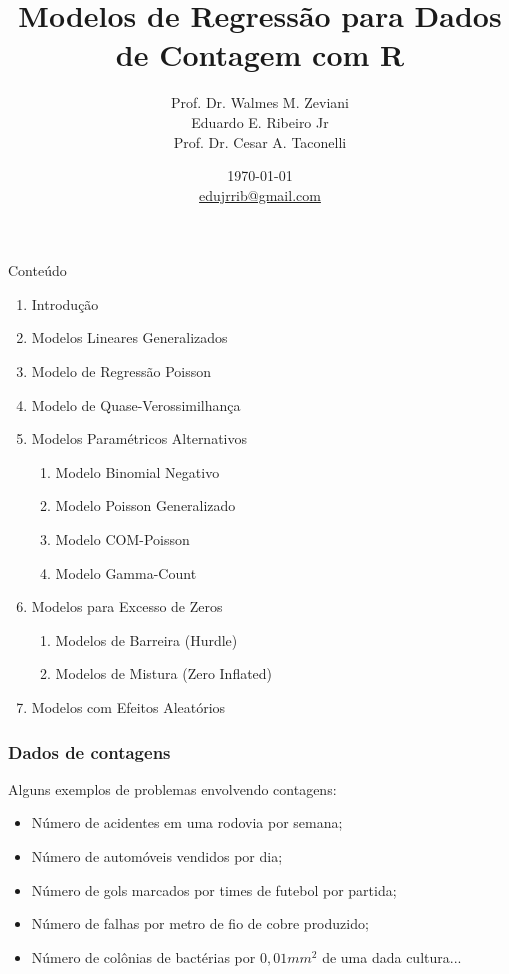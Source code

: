 \documentclass[10pt, aspectratio=169]{beamer}
\title{Modelos de Regressão para Dados de Contagem com R}
\author[Walmes Zeviani, Eduardo Jr \& Cesar Taconelli]{
  Prof. Dr. Walmes M. Zeviani\\
  Eduardo E. Ribeiro Jr\\ 
  Prof. Dr. Cesar A. Taconelli
}
\institute[UFPR]{
  Laboratório de Estatística e Geoinformação \\
  Departamento de Estatística \\
  Universidade Federal do Paraná}
\date{\today \\[0.1cm] \url{edujrrib@gmail.com}}
\begin{document}
\begin{frame}
  \titlepage
\end{frame}



\begin{frame}{Conteúdo}

\begin{multicols}{2}

\begin{enumerate}
    \item Introdução
    \item Modelos Lineares Generalizados
    \item Modelo de Regressão Poisson
    \item Modelo de Quase-Verossimilhança
    \item Modelos Paramétricos Alternativos
    
    \begin{enumerate}
        \item Modelo Binomial Negativo
        \item Modelo Poisson Generalizado
        \item Modelo COM-Poisson
        \item Modelo Gamma-Count
    \end{enumerate}
    \item Modelos para Excesso de Zeros
    \begin{enumerate}
        \item Modelos de Barreira (Hurdle)
        \item Modelos de Mistura (Zero Inflated)
    \end{enumerate}
    \item Modelos com Efeitos Aleatórios
\end{enumerate}

\end{multicols}

\end{frame}







\begin{frame}\frametitle{Dados de contagens}
Alguns exemplos de problemas envolvendo contagens:

\vspace{0,2cm}
\begin{itemize}
\item Número de acidentes em uma rodovia por semana;
\item Número de automóveis vendidos por dia;
\item Número de gols marcados por times de futebol por partida;
\item Número de falhas por metro de fio de cobre produzido;
\item Número de colônias de bactérias por $0,01mm^{2}$ de uma dada cultura...
\end{itemize}
\end{frame}
\end{document}
